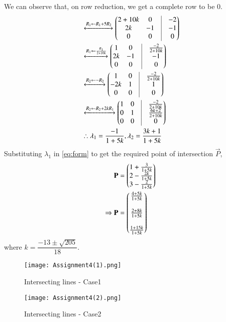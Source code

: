\documentclass[journal,12pt,twocolumn]{IEEEtran}
\begin{document}
We can observe that, on row reduction, we get a complete row to be $0$. 
\begin{align}
    &\xleftrightarrow{R_1\leftarrow R_{1}+5R_{2}}
	\myvec{2+10k & 0 & \vrule & -2 \\
	2k & -1 & \vrule & -1 \\
	0 & 0 & \vrule & 0}\\
	&\xleftrightarrow{R_1\leftarrow \frac{R_{1}}{2+10k}}
	\myvec{1 & 0 & \vrule & \frac{-2}{2+10k} \\
	2k & -1 & \vrule & -1 \\
	0 & 0 & \vrule & 0}\\
	&\xleftrightarrow{R_2\leftarrow -R_{2}}
	\myvec{1 & 0 & \vrule & \frac{-2}{2+10k} \\
	-2k & 1 & \vrule & 1 \\
	0 & 0 & \vrule & 0}\\
	&\xleftrightarrow{R_2\leftarrow R_{2}+2kR_{1}}
	\myvec{1 & 0 & \vrule & \frac{-2}{2+10k} \\
	0 & 1 & \vrule & \frac{6k+2}{2+10k} \\
	0 & 0 & \vrule & 0}\\
	&\therefore \lambda_{1}=\frac{-1}{1+5k},\lambda_{2}=\frac{3k+1}{1+5k}
\end{align}
Substituting $\lambda_{1}$ in \eqref{eq:form} to get the required point of intersection $\vec{P}$,
\begin{align}
    \mathbf{P}&=\begin{pmatrix}1+\frac{3}{1+5k}\\
    2-\frac{2k}{1+5k}\\
    3-\frac{2}{1+5k}\end{pmatrix}\\
    \Rightarrow \mathbf{P}&=\begin{pmatrix}\frac{4+5k}{1+5k}\\\\
    \frac{2+8k}{1+5k}\\\\
    \frac{1+15k}{1+5k}\end{pmatrix}
\end{align}
where $k=\dfrac{-13\pm \sqrt{205}}{18}$.
\begin{figure}[!h]
 \centering
 \texttt{[image: Assignment4(1).png]}
 \caption{Intersecting lines - Case1}
 \label{plot}
\end{figure}
\begin{figure}[!h]
 \centering
 \texttt{[image: Assignment4(2).png]}
 \caption{Intersecting lines - Case2}
 \label{plot}
\end{figure}
\end{document}
